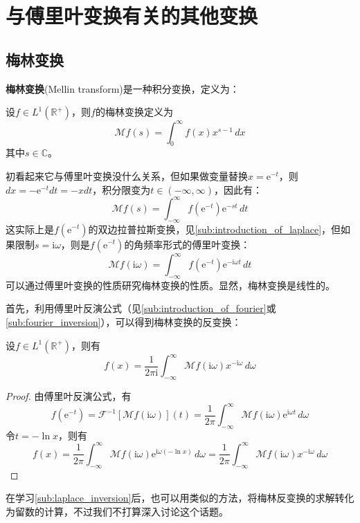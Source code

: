 \documentclass{ctexbook}
\begin{document}
\section{与傅里叶变换有关的其他变换}\label{sec:Other_Transforms}

\subsection{梅林变换}\label{sub:mellin}

\textbf{梅林变换}(Mellin transform)是一种积分变换，定义为：
\begin{definition}[梅林变换]
    设$f\in L^1(\mathbb{R}^+)$，则$f$的梅林变换定义为
    \[\mathcal{M} f(s)=\int_0^{\infty}f(x)x^{s-1}\,dx\]
    其中$s\in\mathbb{C}$。    
\end{definition}

初看起来它与傅里叶变换没什么关系，但如果做变量替换$x=\mathrm{e}^{-t}$，则$dx=-\mathrm{e}^{-t}dt=-x dt$，积分限变为$t\in(-\infty,\infty)$，因此有：
\[\mathcal{M} f(s)=\int_{-\infty}^{\infty}f(\mathrm{e}^{-t})\mathrm{e}^{-s t}\,dt\]
这实际上是$f(\mathrm{e}^{-t})$的双边拉普拉斯变换，见\ref{sub:introduction_of_laplace}，但如果限制$s=\mathrm{i}\omega$，则是$f(\mathrm{e}^{-t})$的角频率形式的傅里叶变换：
\[\mathcal{M} f(\mathrm{i}\omega)=\int_{-\infty}^{\infty}f(\mathrm{e}^{-t})\mathrm{e}^{-\mathrm{i}\omega t}\,dt\]
可以通过傅里叶变换的性质研究梅林变换的性质。显然，梅林变换是线性的。

首先，利用傅里叶反演公式（见\ref{sub:introduction_of_fourier}或\ref{sub:fourier_inversion}），可以得到梅林变换的反变换：
\begin{proposition}[梅林反变换]
    设$f\in L^1(\mathbb{R}^+)$，则有
    \[f(x)=\frac{1}{2\pi \mathrm{i}}\int_{-\infty}^{\infty}\mathcal{M} f(\mathrm{i}\omega)x^{-\mathrm{i}\omega}\,d\omega\]
\end{proposition}
\begin{proof}
    由傅里叶反演公式，有
    \[f(\mathrm{e}^{-t})=\mathcal{F} ^{-1}[\mathcal{M} f(\mathrm{i}\omega)](t)=\frac{1}{2\pi}\int_{-\infty}^{\infty}\mathcal{M} f(\mathrm{i}\omega)\mathrm{e}^{\mathrm{i}\omega t}\,d\omega\]
    令$t=-\ln x$，则有
    \[f(x)=\frac{1}{2\pi}\int_{-\infty}^{\infty}\mathcal{M} f(\mathrm{i}\omega)\mathrm{e}^{\mathrm{i}\omega (-\ln x)}\,d\omega=\frac{1}{2\pi}\int_{-\infty}^{\infty}\mathcal{M} f(\mathrm{i}\omega)x^{-\mathrm{i}\omega}\,d\omega\]
\end{proof}

在学习\ref{sub:laplace_inversion}后，也可以用类似的方法，将梅林反变换的求解转化为留数的计算，不过我们不打算深入讨论这个话题。
\end{document}
